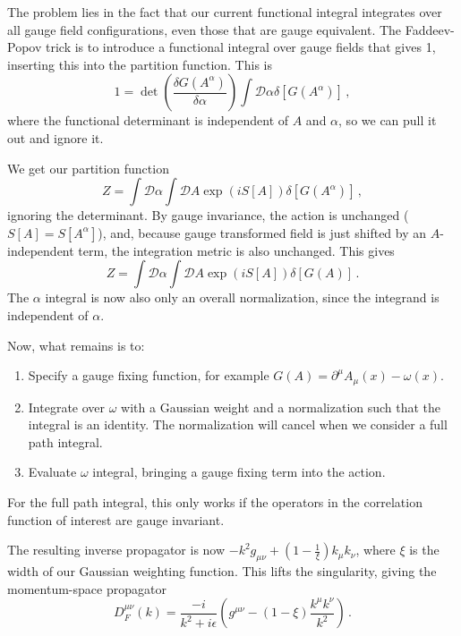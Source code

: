 \documentclass[12pt]{memoir}
\begin{document}
The problem lies in the fact that our current functional integral integrates over all gauge field configurations,
even those that are gauge equivalent.
The Faddeev-Popov trick is to introduce a functional integral over gauge fields that gives 1,
inserting this into the partition function.
This is
\begin{equation}
  1 = \det\left(\frac{\delta G(A^{\alpha})}{\delta \alpha}\right) \int \mathcal{D}\alpha \delta [G(A^{\alpha})]\,,
\end{equation}
where the functional determinant is independent of $A$ and $\alpha$, so we can pull it out and ignore it.

We get our partition function
\begin{equation}
  Z = \int \mathcal{D}\alpha \int \mathcal{D}A \exp(i S[A]) \delta [G(A^{\alpha})]\,,
\end{equation}
ignoring the determinant.
By gauge invariance, the action is unchanged ($S[A] = S[A^{\alpha}]$),
and, because gauge transformed field is just shifted by an $A$-independent term,
the integration metric is also unchanged.
This gives
\begin{equation}
  Z = \int \mathcal{D}\alpha \int \mathcal{D}A \exp(i S[A]) \delta [G(A)]\,.
\end{equation}
The $\alpha$ integral is now also only an overall normalization, since the integrand is independent of $\alpha$.

Now, what remains is to:
\begin{enumerate}
  \item Specify a gauge fixing function, for example $G(A) = \partial^{\mu} A_{\mu}(x) - \omega(x)$.
  \item Integrate over $\omega$ with a Gaussian weight and a normalization such that the integral is an identity.
    The normalization will cancel when we consider a full path integral.
  \item Evaluate $\omega$ integral, bringing a gauge fixing term into the action.
\end{enumerate}
For the full path integral,
this only works if the operators in the correlation function of interest are gauge invariant.

The resulting inverse propagator is now $-k^2 g_{\mu\nu} + (1 - \frac{1}{\xi})k_{\mu} k_{\nu}$,
where $\xi$ is the width of our Gaussian weighting function.
This lifts the singularity,
giving the momentum-space propagator
\begin{equation}
  D_{F}^{\mu\nu}(k) = \frac{-i}{k^2 + i \epsilon}\left(g^{\mu\nu} - (1 - \xi) \frac{k^{\mu}k^{\nu}}{k^2}\right)\,.
\end{equation}
\end{document}
